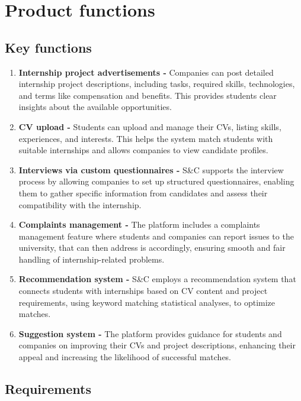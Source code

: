 \section{Product functions}

\subsection{Key functions}

\begin{enumerate}[label=\textbf{KF\arabic* -}]
    \item \textbf{Internship project advertisements -}
    Companies can post detailed internship project descriptions, including tasks, required skills, technologies, and terms like compensation and benefits.
    This provides students clear insights about the available opportunities.
    \item \textbf{CV upload -}
    Students can upload and manage their CVs, listing skills, experiences, and interests.
    This helps the system match students with suitable internships and allows companies to view candidate profiles.
    \item \textbf{Interviews via custom questionnaires -}
    S\&C supports the interview process by allowing companies to set up structured questionnaires, enabling them to gather specific information from candidates and assess their compatibility with the internship.
    \item \textbf{Complaints management -}
    The platform includes a complaints management feature where students and companies can report issues to the university, that can then address is accordingly, ensuring smooth and fair handling of internship-related problems.
    \item \textbf{Recommendation system -}
    S\&C employs a recommendation system that connects students with internships based on CV content and project requirements, using keyword matching statistical analyses, to optimize matches.
    \item \textbf{Suggestion system -}
    The platform provides guidance for students and companies on improving their CVs and project descriptions, enhancing their appeal and increasing the likelihood of successful matches.
\end{enumerate}

\subsection{Requirements}


